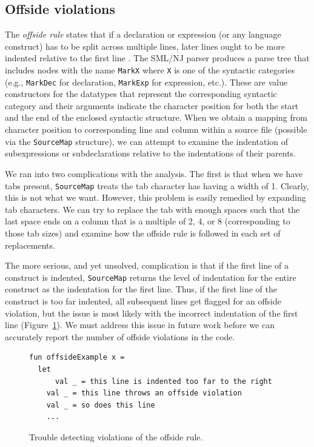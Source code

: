\documentclass[12pt,abstracton]{scrartcl}
\begin{document}
\subsection{Offside violations}\label{subsec:offside}
The \emph{offside rule} states that if a declaration or expression (or any language construct)
has to be split across multiple lines, later lines ought to be more indented relative to
the first line \cite{Lan66}.
The SML/NJ parser produces a parse tree that includes nodes with the name \texttt{MarkX} where \texttt{X} is
one of the syntactic categories (e.g., \texttt{MarkDec} for declaration, \texttt{MarkExp} for expression,
etc.). These are value constructors for the datatypes that represent the corresponding
syntactic category and their arguments indicate the character position for both the start and the
end of the enclosed syntactic structure. When we obtain a mapping from character position
to corresponding line and column within a source file (possible via the \texttt{SourceMap} structure),
we can attempt to examine the indentation of subexpressions or subdeclarations relative to
the indentations of their parents.

We ran into two complications with the analysis. The first is that when we have tabs present,
\texttt{SourceMap} treats the tab character has having a width of 1. Clearly,
this is not what we want. However, this problem is easily remedied
by expanding tab characters.
We can try to replace the tab with enough spaces such that
the last space ends on a column that is a multiple of 2, 4, or 8 (corresponding to those tab sizes)
and examine how the offside rule is followed in each set of replacements.

The more serious, and yet unsolved, complication is that if the first line of a construct
is indented, \texttt{SourceMap} returns the level of indentation
for the entire construct as the indentation for the first line.
Thus, if the first line of the construct is too far indented, all subsequent
lines get flagged for an offside violation, but the issue is most likely
with the incorrect indentation of the first line (Figure~\ref{fig:offside}). We must address this
issue in future work before we can accurately report the number
of offside violations in the code.
\begin{figure}[h!]
\centering
\begin{verbatim}
fun offsideExample x =
  let
      val _ = this line is indented too far to the right
    val _ = this line throws an offside violation
    val _ = so does this line
    ...
\end{verbatim}
\caption{Trouble detecting violations of the offside rule.}
\label{fig:offside}
\end{figure}
\end{document}
